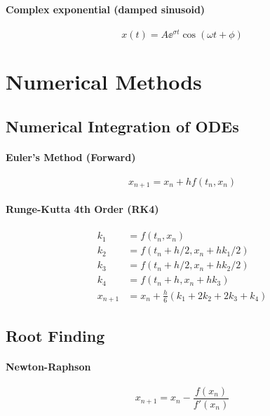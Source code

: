 \subsubsection{Complex exponential (damped sinusoid)}
\begin{equation}
x(t) = A\ee^{\sigma t}\cos(\omega t + \phi)
\end{equation}

\chapter{Numerical Methods}
\label{ch:numerical}

\section{Numerical Integration of ODEs}

\subsubsection{Euler's Method (Forward)}
\begin{equation}
x_{n+1} = x_n + h f(t_n, x_n)
\end{equation}

\subsubsection{Runge-Kutta 4th Order (RK4)}
\begin{align}
k_1 &= f(t_n, x_n) \\
k_2 &= f(t_n + h/2, x_n + hk_1/2) \\
k_3 &= f(t_n + h/2, x_n + hk_2/2) \\
k_4 &= f(t_n + h, x_n + hk_3) \\
x_{n+1} &= x_n + \frac{h}{6}(k_1 + 2k_2 + 2k_3 + k_4)
\end{align}

\section{Root Finding}

\subsubsection{Newton-Raphson}
\begin{equation}
x_{n+1} = x_n - \frac{f(x_n)}{f'(x_n)}
\end{equation}

